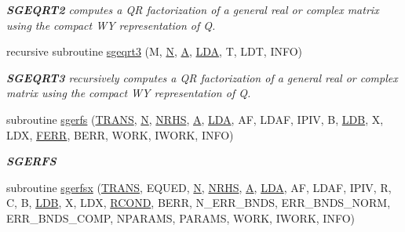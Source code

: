 \begin{DoxyCompactItemize}
\begin{DoxyCompactList}\small\item\em {\bfseries S\+G\+E\+Q\+R\+T2} computes a Q\+R factorization of a general real or complex matrix using the compact W\+Y representation of Q. \end{DoxyCompactList}\item 
recursive subroutine \hyperlink{group__realGEcomputational_ga0ac033e696d80b5aa9e5289e47e3e7f9}{sgeqrt3} (M, \hyperlink{polmisc_8c_a0240ac851181b84ac374872dc5434ee4}{N}, \hyperlink{classA}{A}, \hyperlink{example__user_8c_ae946da542ce0db94dced19b2ecefd1aa}{L\+D\+A}, T, L\+D\+T, I\+N\+F\+O)
\begin{DoxyCompactList}\small\item\em {\bfseries S\+G\+E\+Q\+R\+T3} recursively computes a Q\+R factorization of a general real or complex matrix using the compact W\+Y representation of Q. \end{DoxyCompactList}\item 
subroutine \hyperlink{group__realGEcomputational_ga39adc3981edd0d968a4369941431ce3d}{sgerfs} (\hyperlink{superlu__enum__consts_8h_a0c4e17b2d5cea33f9991ccc6a6678d62a1f61e3015bfe0f0c2c3fda4c5a0cdf58}{T\+R\+A\+N\+S}, \hyperlink{polmisc_8c_a0240ac851181b84ac374872dc5434ee4}{N}, \hyperlink{example__user_8c_aa0138da002ce2a90360df2f521eb3198}{N\+R\+H\+S}, \hyperlink{classA}{A}, \hyperlink{example__user_8c_ae946da542ce0db94dced19b2ecefd1aa}{L\+D\+A}, A\+F, L\+D\+A\+F, I\+P\+I\+V, B, \hyperlink{example__user_8c_a50e90a7104df172b5a89a06c47fcca04}{L\+D\+B}, X, L\+D\+X, \hyperlink{superlu__enum__consts_8h_af00a42ecad444bbda75cde1b64bd7e72a78fd14d7abebae04095cfbe02928f153}{F\+E\+R\+R}, B\+E\+R\+R, W\+O\+R\+K, I\+W\+O\+R\+K, I\+N\+F\+O)
\begin{DoxyCompactList}\small\item\em {\bfseries S\+G\+E\+R\+F\+S} \end{DoxyCompactList}\item 
subroutine \hyperlink{group__realGEcomputational_gad283ab77593ac86c29172972b41f917b}{sgerfsx} (\hyperlink{superlu__enum__consts_8h_a0c4e17b2d5cea33f9991ccc6a6678d62a1f61e3015bfe0f0c2c3fda4c5a0cdf58}{T\+R\+A\+N\+S}, E\+Q\+U\+E\+D, \hyperlink{polmisc_8c_a0240ac851181b84ac374872dc5434ee4}{N}, \hyperlink{example__user_8c_aa0138da002ce2a90360df2f521eb3198}{N\+R\+H\+S}, \hyperlink{classA}{A}, \hyperlink{example__user_8c_ae946da542ce0db94dced19b2ecefd1aa}{L\+D\+A}, A\+F, L\+D\+A\+F, I\+P\+I\+V, R, C, B, \hyperlink{example__user_8c_a50e90a7104df172b5a89a06c47fcca04}{L\+D\+B}, X, L\+D\+X, \hyperlink{superlu__enum__consts_8h_af00a42ecad444bbda75cde1b64bd7e72a9b5c151728d8512307565994c89919d5}{R\+C\+O\+N\+D}, B\+E\+R\+R, N\+\_\+\+E\+R\+R\+\_\+\+B\+N\+D\+S, E\+R\+R\+\_\+\+B\+N\+D\+S\+\_\+\+N\+O\+R\+M, E\+R\+R\+\_\+\+B\+N\+D\+S\+\_\+\+C\+O\+M\+P, N\+P\+A\+R\+A\+M\+S, P\+A\+R\+A\+M\+S, W\+O\+R\+K, I\+W\+O\+R\+K, I\+N\+F\+O)

\end{DoxyCompactItemize}
